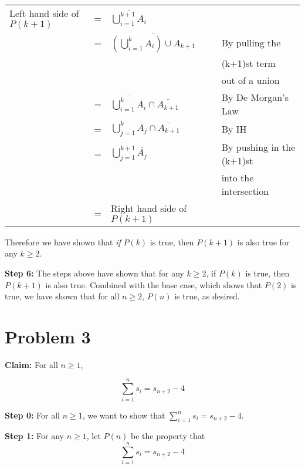 \documentclass{article}
\begin{document}
\begin{sloppypar}
	\begin{tabular}{l l l l}
		Left hand side of $P(k+1)$ & = & \(\overline{\bigcup_{i=1}^{k+1}A_i}\) & \\
								   & = & \(\overline{\left(\bigcup_{i=1}^{k}A_i\right)\cup A_{k+1}}\) & By pulling the \\
								   &   &                                                              & (k+1)st term   \\
								   &   &                                                              & out of a union \\
								   & = & \(\overline{\bigcup_{i=1}^{k}A_i}\cap\overline{A_{k+1}}\) & By De Morgan's Law \\
								   & = & \(\bigcup_{j=1}^{k}\overline{A_j}\cap\overline{A_{k+1}}\) & By IH \\
								   & = & \(\bigcup_{j=1}^{k+1}\overline{A_j}\) & By pushing in the (k+1)st \\
								   &   &                                       & into the intersection \\
								   & = & Right hand side of $P(k+1)$ & \\
	\end{tabular}	
\end{sloppypar}
Therefore we have shown that \textit{if} $P(k)$ is true, then $P(k+1)$ is also true for any $k\geq 2$.\vspace{15pt}


\textbf{Step 6:} The steps above have shown that for any $k\geq 2$, if $P(k)$ is true, then $P(k+1)$ is also true. Combined with the base case, which shows that $P(2)$ is true, we have shown that for all $n\geq 2$, $P(n)$ is true, as desired.

\pagebreak

\section{Problem 3}

\textbf{Claim:} For all $n\geq 1$,

\begin{equation}
	\sum_{i=1}^{n} s_i=s_{n+2}-4
\end{equation}

\textbf{Step 0:} For all $n\geq 1$, we want to show that $\sum_{i=1}^{n} s_i=s_{n+2}-4$.
\vspace{15pt}

\textbf{Step 1:} For any $n\geq 1$, let $P(n)$ be the property that
\[
	\sum_{i=1}^{n} s_i=s_{n+2}-4	
\]
\end{document}
